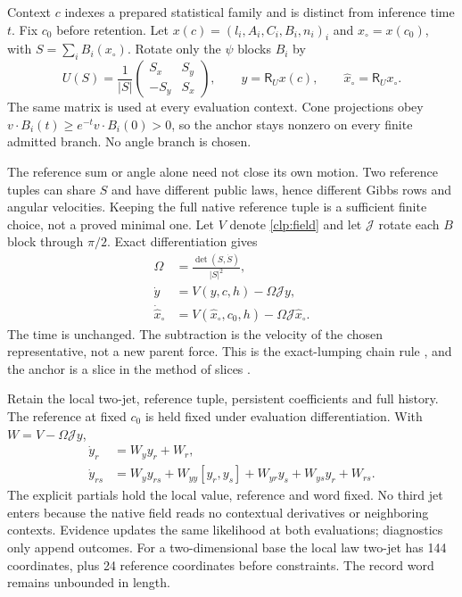 Context $c$ indexes a prepared statistical family and is distinct from inference time $t$. Fix $c_0$ before retention. Let $x(c)=(l_i,A_i,C_i,B_i,n_i)_i$ and $x_\circ=x(c_0)$, with $S=\sum_iB_i(x_\circ)$. Rotate only the $\psi$ blocks $B_i$ by
\begin{equation}
 U(S)=\frac1{|S|}\begin{pmatrix}S_x&S_y\\-S_y&S_x\end{pmatrix},\qquad
 y=\mathsf R_Ux(c),\qquad \widehat x_\circ=\mathsf R_Ux_\circ.
 \label{clp:reference}
\end{equation}
The same matrix is used at every evaluation context. Cone projections obey $v\cdot B_i(t)\ge e^{-t}v\cdot B_i(0)>0$, so the anchor stays nonzero on every finite admitted branch. No angle branch is chosen.

The reference sum or angle alone need not close its own motion. Two reference tuples can share $S$ and have different public laws, hence different Gibbs rows and angular velocities. Keeping the full native reference tuple is a sufficient finite choice, not a proved minimal one. Let $V$ denote \cref{clp:field} and let $\mathcal J$ rotate each $B$ block through $\pi/2$. Exact differentiation gives
\begin{equation}
 \begin{aligned}
 \Omega&=\frac{\det(S,\dot S)}{|S|^2},\\
 \dot y&=V(y,c,h)-\Omega\mathcal Jy,\\
 \dot{\widehat x}_\circ&=V(\widehat x_\circ,c_0,h)-\Omega\mathcal J\widehat x_\circ.
 \end{aligned}
 \label{clp:closed}
\end{equation}
The time is unchanged. The subtraction is the velocity of the chosen representative, not a new parent force. This is the exact-lumping chain rule \citep{HorstmeyerAtay2016}, and the anchor is a slice in the method of slices \citep{RowleyEtAl2003}.

Retain the local two-jet, reference tuple, persistent coefficients and full history. The reference at fixed $c_0$ is held fixed under evaluation differentiation. With $W=V-\Omega\mathcal Jy$,
\begin{equation}
 \begin{aligned}
 \dot y_r&=W_y y_r+W_r,\\
 \dot y_{rs}&=W_y y_{rs}+W_{yy}[y_r,y_s]
 +W_{yr}y_s+W_{ys}y_r+W_{rs}.
 \end{aligned}
 \label{clp:jets}
\end{equation}
The explicit partials hold the local value, reference and word fixed. No third jet enters because the native field reads no contextual derivatives or neighboring contexts. Evidence updates the same likelihood at both evaluations; diagnostics only append outcomes. For a two-dimensional base the local law two-jet has 144 coordinates, plus 24 reference coordinates before constraints. The record word remains unbounded in length.


